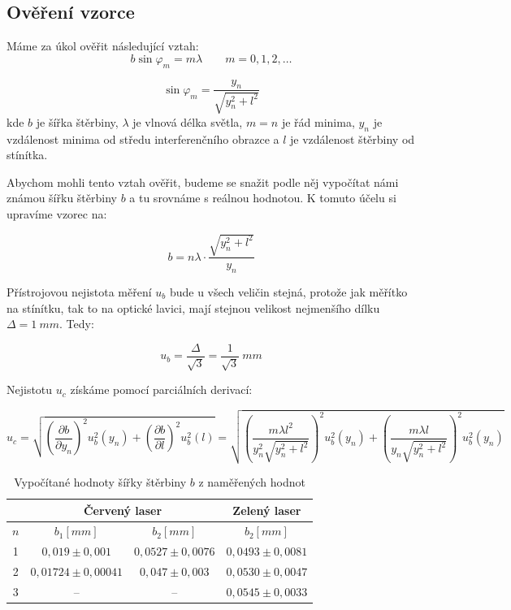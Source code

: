 \documentclass[a4paper,12pt]{article}
\begin{document}
\subsection{Ověření vzorce}
Máme za úkol ověřit následující vztah:
$$
b \sin{\varphi_m} = m\lambda \qquad m=0,1,2,\dots
$$

$$
\sin \varphi_m = \frac{y_n}{\sqrt{y_n^2 + l^2}}
$$
kde $b$ je šířka štěrbiny, $\lambda$ je vlnová délka světla, $m=n$ je řád minima, $y_n$ je vzdálenost minima od středu interferenčního obrazce a $l$ je vzdálenost štěrbiny od stínítka.

Abychom mohli tento vztah ověřit, budeme se snažit podle něj vypočítat námi známou šířku štěrbiny $b$ a tu srovnáme s reálnou hodnotou. K tomuto účelu si upravíme vzorec na:

$$
b = n\lambda \cdot \frac{\sqrt{y_n^2 + l^2}}{y_n}
$$

Přístrojovou nejistota měření $u_b$ bude u všech veličin stejná, protože jak měřítko na stínítku, tak to na optické lavici, mají stejnou velikost nejmenšího dílku $\Delta = 1\ \unit{mm}$. Tedy:

$$
u_b = \frac{\Delta}{\sqrt{3}} = \frac{1}{\sqrt{3}}\ \unit{mm}
$$

Nejistotu $u_c$ získáme pomocí parciálních derivací:

$$
u_c = \sqrt{\left (\frac{\partial b}{\partial y_n}\right)^2 u_b^2(y_n) + \left (\frac{\partial b}{\partial l}\right)^2 u_b^2(l)} = \sqrt{\left(\frac{m\lambda l^2}{y_n^2 \sqrt{y_n^2 + l^2}} \right)^2 u_b^2(y_n) + \left(\frac{m\lambda l}{y_n \sqrt{y_n^2 + l^2}} \right)^2 u_b^2(y_n)}
$$

\begin{table}[H]
\centering
\renewcommand{\arraystretch}{1.5}
\begin{tabular}{|c|c|c|c|}
\hline
\multicolumn{1}{|c|}{} &
\multicolumn{2}{c|}{\textbf{Červený laser}} &
\textbf{Zelený laser} \\
\hline
$n$ &
$b_1\unit{[mm]}$ &
$b_2\unit{[mm]}$ &
$b_2\unit{[mm]}$ \\
\hline
1 &
$0{,}019 \pm 0{,}001$ &
$0{,}0527 \pm 0{,}0076$ &
$0{,}0493 \pm 0{,}0081$ \\
\hline
2 &
$0{,}01724 \pm 0{,}00041$ &
$0{,}047 \pm 0{,}003$ &
$0{,}0530 \pm 0{,}0047$ \\
\hline
3 &
-- &
-- &
$0{,}0545 \pm 0{,}0033$ \\
\hline
\end{tabular}
\caption{Vypočítané hodnoty šířky štěrbiny $b$ z naměřených hodnot}
\label{tab:sterbina_b_s_nejistotou}
\end{table}
\end{document}
